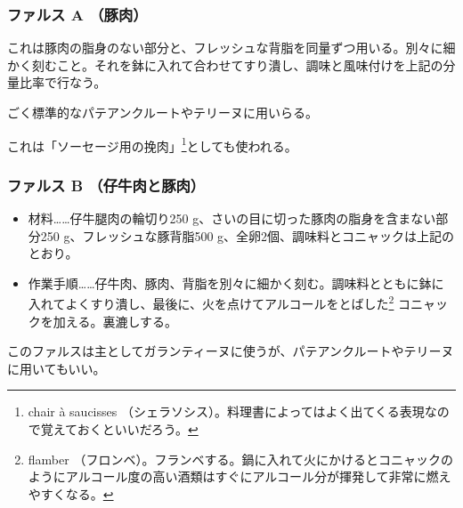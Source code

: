 \begin{recette}
\atoaki{}

\hypertarget{farce-froide-a}{%
\subsubsection{ファルス A （豚肉）}\label{farce-froide-a}}



これは豚肉の脂身のない部分と、フレッシュな背脂を同量ずつ用いる。別々に細かく刻むこと。それを鉢に入れて合わせてすり潰し、調味と風味付けを上記の分量比率で行なう。

ごく標準的なパテアンクルートやテリーヌに用いらる。

これは「\protect\hypertarget{chair-a-saucisse}{ソーセージ用の挽肉}」\footnote{chair
  à saucisses
  （シェラソシス）。料理書によってはよく出てくる表現なので覚えておくといいだろう。}としても使われる。\label{chair-a-saucisse}

\atoaki{}

\hypertarget{farce-froide-b}{%
\subsubsection{ファルス B （仔牛肉と豚肉）}\label{farce-froide-b}}



\begin{itemize}
\item
  材料\ldots{}\ldots{}仔牛腿肉の輪切り250
  g、さいの目に切った豚肉の脂身を含まない部分250
  g、フレッシュな豚背脂500
  g、全卵2個、調味料とコニャックは上記のとおり。
\item
  作業手順\ldots{}\ldots{}仔牛肉、豚肉、背脂を別々に細かく刻む。調味料とともに鉢に入れてよくすり潰し、最後に、火を点けてアルコールをとばした\footnote{flamber
    （フロンベ）。フランベする。鍋に入れて火にかけるとコニャックのようにアルコール度の高い酒類はすぐにアルコール分が揮発して非常に燃えやすくなる。}
  コニャックを加える。裏漉しする。
\end{itemize}

このファルスは主としてガランティーヌに使うが、パテアンクルートやテリーヌに用いてもいい。

\atoaki{}


\end{recette}
